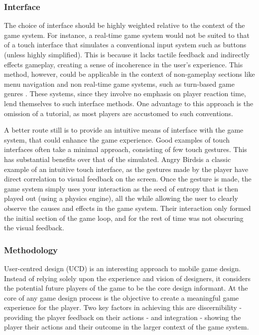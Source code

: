 \documentclass[final]{cmpreport}
\begin{document}
\subsubsection{Interface}
The choice of interface should be highly weighted relative to the context of the game system. For instance, a real-time game system would not be suited to that of a touch interface that simulates a conventional input system such as buttons (unless highly simplified). This is because it lacks tactile feedback and indirectly effects gameplay, creating a sense of incoherence in the user's experience. This method, however, could be applicable in the context of non-gameplay sections like menu navigation and non real-time game systems, such as turn-based game genres \citep{XuBradburn}. These systems, since they  involve no emphasis on player reaction time, lend themselves to such interface methods. One advantage to this approach is the omission of a tutorial, as most players are accustomed to such conventions.

A better route still is to provide an intuitive means of interface with the game system, that could enhance the game experience. Good examples of touch interfaces often take a minimal approach, consisting of few touch gestures. This has substantial benefits over that of the simulated. Angry Birds\footnotemark is a classic example of an intuitive touch interface, as the gestures made by the player have direct correlation to visual feedback on the screen. Once the gesture is made, the game system simply uses your interaction as the seed of entropy that is then played out (using a physics engine), all the while allowing the user to clearly observe the causes and effects in the game system. Their interaction only formed the initial section of the game loop, and for the rest of time was not obscuring the visual feedback.


\subsubsection{Methodology}
User-centred design (UCD) is an interesting approach to mobile game design. Instead of relying solely upon the experience and vision of designers, it considers the potential future players of the game to be the core design informant. At the core of any game design process is the objective to create a meaningful game experience for the player. Two key factors in achieving this are discernibility - providing the player feedback on their actions - and integration - showing the player their actions and their outcome in the larger context of the game system.
\end{document}
